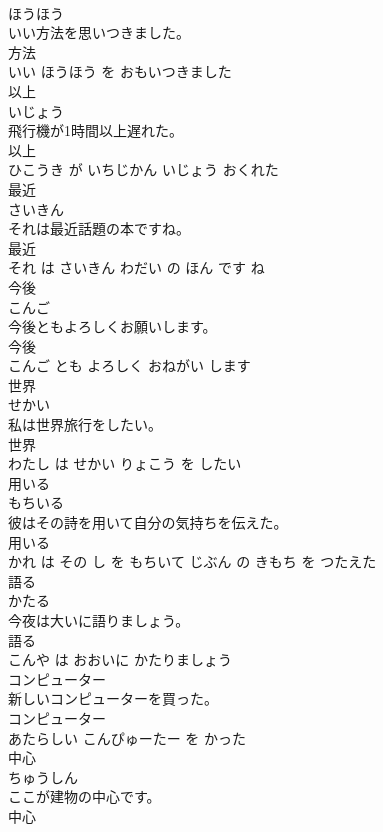 \documentclass[8pt]{extreport}
\begin{document}
\begin{CJK}{UTF8}{min}
\\	ほうほう			
\\	いい方法を思いつきました。	
\\	方法 
\\	いい ほうほう を おもいつきました			
\\	以上	
\\	いじょう			
\\	飛行機が1時間以上遅れた。	
\\	以上 
\\	ひこうき が いちじかん いじょう おくれた			
\\	最近	
\\	さいきん			
\\	それは最近話題の本ですね。	
\\	最近 
\\	それ は さいきん わだい の ほん です ね			
\\	今後	
\\	こんご			
\\	今後ともよろしくお願いします。	
\\	今後 
\\	こんご とも よろしく おねがい します			
\\	世界	
\\	せかい			
\\	私は世界旅行をしたい。	
\\	世界 
\\	わたし は せかい りょこう を したい			
\\	用いる	
\\	もちいる			
\\	彼はその詩を用いて自分の気持ちを伝えた。	
\\	用いる 
\\	かれ は その し を もちいて じぶん の きもち を つたえた			
\\	語る	
\\	かたる			
\\	今夜は大いに語りましょう。	
\\	語る 
\\	こんや は おおいに かたりましょう			
\\	コンピューター	
\\	新しいコンピューターを買った。	
\\	コンピューター 
\\	あたらしい こんぴゅーたー を かった			
\\	中心	
\\	ちゅうしん			
\\	ここが建物の中心です。	
\\	中心 

\end{CJK}
\end{document}
